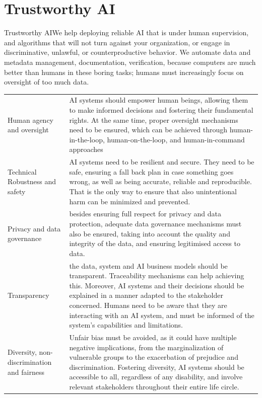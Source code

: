 \documentclass[
  a4paper,
  openany, a4paper, oneside]{book}
\begin{document}
\hypertarget{trustworhty-ai}{%
\chapter{Trustworthy AI}\label{trustworhty-ai}}

Trustworthy AIWe help deploying reliable AI that is under human supervision, and algorithms that will not turn against your organization, or engage in discriminative, unlawful, or counterproductive behavior. We automate data and metadata management, documentation, verification, because computers are much better than humans in these boring tasks; humans must increasingly focus on oversight of too much data.

\begin{longtable}[]{@{}
  >{\raggedright\arraybackslash}p{}
  >{\centering\arraybackslash}p{}@{}}
\toprule
& \\
\midrule
\endhead
Human agency and oversight & AI systems should empower human beings, allowing them to make informed decisions and fostering their fundamental rights. At the same time, proper oversight mechanisms need to be ensured, which can be achieved through human-in-the-loop, human-on-the-loop, and human-in-command approaches \\
Technical Robustness and safety & AI systems need to be resilient and secure. They need to be safe, ensuring a fall back plan in case something goes wrong, as well as being accurate, reliable and reproducible. That is the only way to ensure that also unintentional harm can be minimized and prevented. \\
Privacy and data governance & besides ensuring full respect for privacy and data protection, adequate data governance mechanisms must also be ensured, taking into account the quality and integrity of the data, and ensuring legitimised access to data. \\
Transparency & the data, system and AI business models should be transparent. Traceability mechanisms can help achieving this. Moreover, AI systems and their decisions should be explained in a manner adapted to the stakeholder concerned. Humans need to be aware that they are interacting with an AI system, and must be informed of the system's capabilities and limitations. \\
Diversity, non-discrimination and fairness & Unfair bias must be avoided, as it could have multiple negative implications, from the marginalization of vulnerable groups to the exacerbation of prejudice and discrimination. Fostering diversity, AI systems should be accessible to all, regardless of any disability, and involve relevant stakeholders throughout their entire life circle. \\

\end{longtable}
\end{document}
